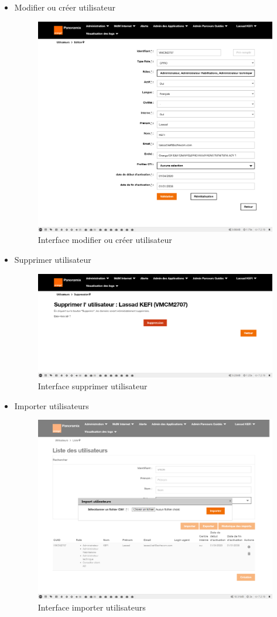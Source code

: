 \begin{itemize}
	\item Modifier ou créer utilisateur
	\begin{figure}[H]
		\centering
		\includegraphics[width=0.65\linewidth]{img/screenshots/users/modif}
		\caption[Interface modifier ou créer utilisateur]{Interface modifier ou créer utilisateur}
		\label{fig:modif-user}
	\end{figure}
	\newpage
	\item Supprimer utilisateur
	\begin{figure}[H]
		\centering
		\includegraphics[width=0.65\linewidth]{img/screenshots/users/delete}
		\caption[Interface supprimer utilisateur]{Interface supprimer utilisateur}
		\label{fig:delete-user-ihm}
	\end{figure}

	\item Importer utilisateurs
	\begin{figure}[H]
		\centering
		\includegraphics[width=0.65\linewidth]{img/screenshots/users/import}
		\caption[Interface importer utilisateurs]{Interface importer utilisateurs}
		\label{fig:import-user-ihm}
	\end{figure}


\end{itemize}
